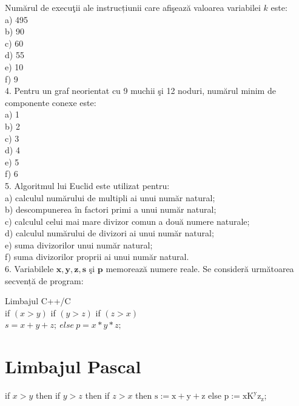 \documentclass[10pt]{article}
\begin{document}
Numărul de execuţii ale instrucțiunii care afişează valoarea variabilei $k$ este:\\
a) 495\\
b) 90\\
c) 60\\
d) 55\\
e) 10\\
f) 9\\
4. Pentru un graf neorientat cu 9 muchii şi 12 noduri, numărul minim de componente conexe este:\\
a) 1\\
b) 2\\
c) 3\\
d) 4\\
e) 5\\
f) 6\\
5. Algoritmul lui Euclid este utilizat pentru:\\
a) calculul numărului de multipli ai unui număr natural;\\
b) descompunerea în factori primi a unui număr natural;\\
c) calculul celui mai mare divizor comun a două numere naturale;\\
d) calculul numărului de divizori ai unui număr natural;\\
e) suma divizorilor unui număr natural;\\
f) suma divizorilor proprii ai unui număr natural.\\
6. Variabilele $\mathbf{x}, \mathbf{y}, \mathbf{z}, \mathbf{s}$ şi $\mathbf{p}$ memorează numere reale. Se consideră următoarea secvență de program:

Limbajul C++/C\\
if $(x>y)$ if $(y>z)$ if $(z>x)$\\
$s=x+y+z ; ~ e l s e ~ p=x * y * z ; ~$

\section*{Limbajul Pascal}
if $x>y$ then if $y>z$ then if $z>x$ then $\mathrm{s}:=\mathrm{x}+\mathrm{y}+\mathrm{z}$ else $\mathrm{p}:=\mathrm{x} \mathrm{K}^{\mathrm{y}} \mathrm{z}_{\mathrm{z}}$;
\end{document}
